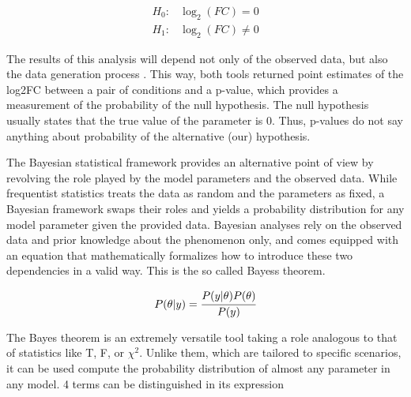 \documentclass[11pt, a4paper]{report}
\begin{document}
\begin{align}
H_0: & \log_2(FC) = 0 \nonumber \\
H_1: & \log_2(FC) \neq 0 \nonumber
\end{align}

The results of this analysis will depend not only of the observed data, but also the data generation process \cite{Kruschke}. This way, both tools returned point estimates of the log2FC between a pair of conditions and a p-value, which provides a measurement of the probability of the null hypothesis. The null hypothesis usually states that the true value of the parameter is 0. Thus, p-values do not say anything about probability of the alternative (our) hypothesis.

The Bayesian statistical framework provides an alternative point of view by revolving the role played by the model parameters and the observed data. While frequentist statistics treats the data as random and the parameters as fixed, a Bayesian framework swaps their roles and yields a probability distribution for any model parameter given the provided data. Bayesian analyses rely on the observed data and prior knowledge about the phenomenon only, and comes equipped with an equation that mathematically formalizes how to introduce these two dependencies in a valid way. This is the so called Bayes\textquotesingle s theorem.

\begin{equation}
P(\theta | y) = \cfrac{P(y | \theta) P(\theta)}{P(y)}
\end{equation}

The Bayes theorem is an extremely versatile tool taking a role analogous to that of statistics like T, F, or $\chi^2$. Unlike them, which are tailored to specific scenarios, it can be used compute the probability distribution of almost any parameter in any model. 4 terms can be distinguished in its expression
\end{document}
